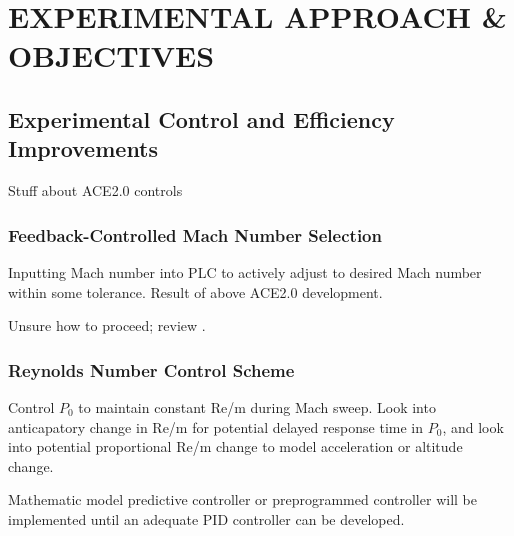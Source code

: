 %
%  
%


\chapter{EXPERIMENTAL APPROACH \& OBJECTIVES}

\section{Experimental Control and Efficiency Improvements} 

Stuff about ACE2.0 controls

\subsection{Feedback-Controlled Mach Number Selection}

Inputting Mach number into PLC to actively adjust to desired Mach number within some tolerance. Result of above ACE2.0 development.


Unsure how to proceed; review \cite{stephens-hubbard}.

\subsection{Reynolds Number Control Scheme}

Control $P_{0}$ to maintain constant Re/m during Mach sweep. Look into anticapatory change in Re/m for potential delayed response time in $P_{0}$, and look into potential proportional Re/m change to model acceleration or altitude change.

Mathematic model predictive controller or preprogrammed controller will be implemented until an adequate PID controller can be developed.

